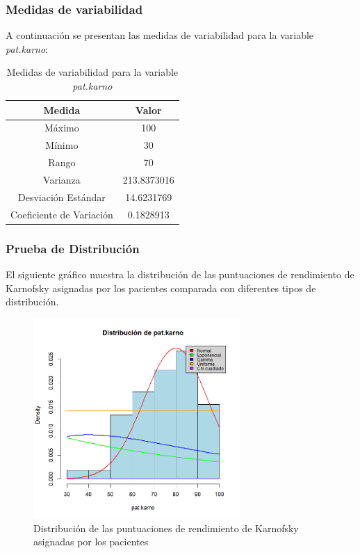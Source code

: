 \documentclass[a4paper,12pt]{article}
\begin{document}
    \subsubsection*{Medidas de variabilidad}
    
    A continuación se presentan las medidas de variabilidad para la variable \textit{pat.karno}:
    
    \begin{table}[h!]
        \centering
        \begin{tabular}{|c|c|}
            \hline
            \textbf{Medida} & \textbf{Valor} \\
            \hline
            Máximo & 100 \\
            \hline
            Mínimo & 30 \\
            \hline
            Rango & 70 \\
            \hline
            Varianza & 213.8373016 \\
            \hline
            Desviación Estándar & 14.6231769 \\
            \hline
            Coeficiente de Variación & 0.1828913 \\
            \hline
        \end{tabular}
        \caption{Medidas de variabilidad para la variable \textit{pat.karno}}
        \label{tab:medidas_variabilidad_pat_karno}
    \end{table}

    \newpage

    \subsubsection*{Prueba de Distribución}

    El siguiente gráfico muestra la distribución de las puntuaciones de rendimiento de Karnofsky asignadas por los pacientes comparada con diferentes tipos de distribución.

    \begin{figure}[h]
        \centering
        \includegraphics[width=0.7\textwidth]{distribucion_pat.karno.png}
        \caption{Distribución de las puntuaciones de rendimiento de Karnofsky asignadas por los pacientes}
        \label{fig:pat.karno}
    \end{figure}
\end{document}
